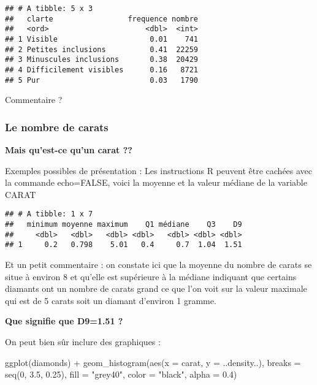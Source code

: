 \documentclass[
]{article}
\newenvironment{Shaded}{\begin{snugshade}}{\end{snugshade}}
\newcommand{\AttributeTok}[1]{\textcolor[rgb]{0.77,0.63,0.00}{#1}}
\newcommand{\DecValTok}[1]{\textcolor[rgb]{0.00,0.00,0.81}{#1}}
\newcommand{\FloatTok}[1]{\textcolor[rgb]{0.00,0.00,0.81}{#1}}
\newcommand{\FunctionTok}[1]{\textcolor[rgb]{0.00,0.00,0.00}{#1}}
\newcommand{\NormalTok}[1]{#1}
\newcommand{\SpecialCharTok}[1]{\textcolor[rgb]{0.00,0.00,0.00}{#1}}
\newcommand{\StringTok}[1]{\textcolor[rgb]{0.31,0.60,0.02}{#1}}
\begin{document}
\begin{verbatim}
## # A tibble: 5 x 3
##   clarte                 frequence nombre
##   <ord>                      <dbl>  <int>
## 1 Visible                     0.01    741
## 2 Petites inclusions          0.41  22259
## 3 Minuscules inclusions       0.38  20429
## 4 Difficilement visibles      0.16   8721
## 5 Pur                         0.03   1790
\end{verbatim}

Commentaire ?

\hypertarget{le-nombre-de-carats}{%
\subsubsection{Le nombre de carats}\label{le-nombre-de-carats}}

\textbf{Mais qu'est-ce qu'un carat ??}

Exemples possibles de présentation : Les instructions R peuvent être
cachées avec la commande echo=FALSE, voici la moyenne et la valeur
médiane de la variable CARAT

\begin{verbatim}
## # A tibble: 1 x 7
##   minimum moyenne maximum    Q1 médiane    Q3    D9
##     <dbl>   <dbl>   <dbl> <dbl>   <dbl> <dbl> <dbl>
## 1     0.2   0.798    5.01   0.4     0.7  1.04  1.51
\end{verbatim}

Et un petit commentaire : on constate ici que la moyenne du nombre de
carats se situe à environ 8 et qu'elle est supérieure à la médiane
indiquant que certains diamants ont un nombre de carats grand ce que
l'on voit sur la valeur maximale qui est de 5 carats soit un diamant
d'environ 1 gramme.

\textbf{Que signifie que D9=1.51 ?}

On peut bien sûr inclure des graphiques :

\begin{Shaded}
\begin{Highlighting}[]
\FunctionTok{ggplot}\NormalTok{(diamonds) }\SpecialCharTok{+}
  \FunctionTok{geom\_histogram}\NormalTok{(}\FunctionTok{aes}\NormalTok{(}\AttributeTok{x =}\NormalTok{ carat, }\AttributeTok{y =}\NormalTok{ ..density..), }\AttributeTok{breaks =} \FunctionTok{seq}\NormalTok{(}\DecValTok{0}\NormalTok{, }\FloatTok{3.5}\NormalTok{, }\FloatTok{0.25}\NormalTok{), }\AttributeTok{fill =} \StringTok{"grey40"}\NormalTok{, }\AttributeTok{color =} \StringTok{"black"}\NormalTok{, }\AttributeTok{alpha =} \FloatTok{0.4}\NormalTok{)}
\end{Highlighting}
\end{Shaded}
\end{document}
